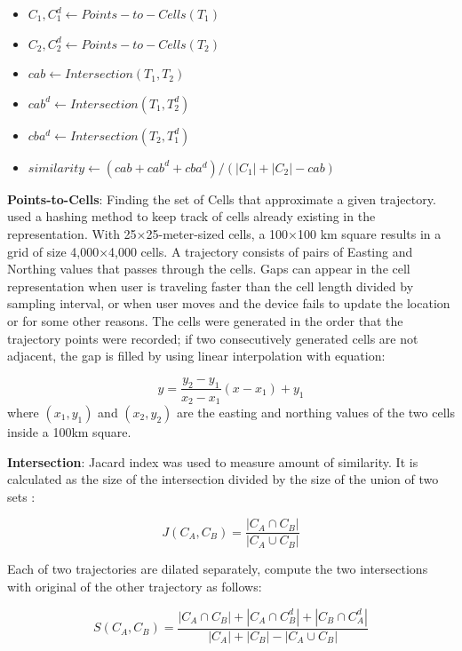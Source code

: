 \documentclass[a4paper, 12pt]{article}
\begin{document}
\begin{itemize}
    \item $C_{1}, C_{1}^d \leftarrow Points-to-Cells(T_{1})$
    \item $C_{2}, C_{2}^d \leftarrow Points-to-Cells(T_{2})$
    \item $cab \leftarrow Intersection(T_{1}, T_{2})$
    \item $cab^d \leftarrow Intersection(T_{1}, T_{2}^d)$
    \item $cba^d \leftarrow Intersection(T_{2}, T_{1}^d)$
    \item $similarity \leftarrow (cab + cab^d + cba^d)/(|C_{1}| + |C_{2}| - cab)$
\end{itemize}

\textbf{Points-to-Cells}: Finding the set of Cells that approximate a given trajectory. \cite{mariescu2017grid} used a hashing method to keep track of cells already existing in the representation. With 25×25-meter-sized cells, a 100×100 km square results in a grid of size 4,000×4,000 cells. A trajectory consists of pairs of Easting and Northing values that passes through the cells. Gaps can appear in the cell representation when user is traveling faster than the cell length divided by sampling interval, or when user moves and the device fails to update the location or for some other reasons. The cells were generated in the order that the trajectory points were recorded; if two consecutively generated cells are not adjacent, the gap is filled by using linear interpolation with equation:

\begin{equation} \label{eq12}
    y = \frac{y_2 - y_1}{x_2 - x_1}(x - x_1) + y_1
\end{equation}
where $(x_1, y_1)$ and $(x_2, y_2)$ are the easting and northing values of the two cells inside a 100km square.

\textbf{Intersection}: Jacard index was used to measure amount of similarity. It is calculated as the size of the intersection divided by the size of the union of two sets \citep{mariescu2017grid}:

\begin{equation} \label{eq13}
    J(C_A, C_B) = \frac{|C_A \cap C_B|}{|C_A \cup C_B|}
\end{equation}

Each of two trajectories are dilated separately, compute the two intersections with original of the other trajectory as follows:

\begin{equation} \label{eq14}
    S(C_A, C_B) = \frac{|C_A \cap C_B| + |C_A \cap C_B^d| + |C_B \cap C_A^d|}{|C_A| + |C_B| - |C_A \cup C_B|}
\end{equation}
\end{document}

